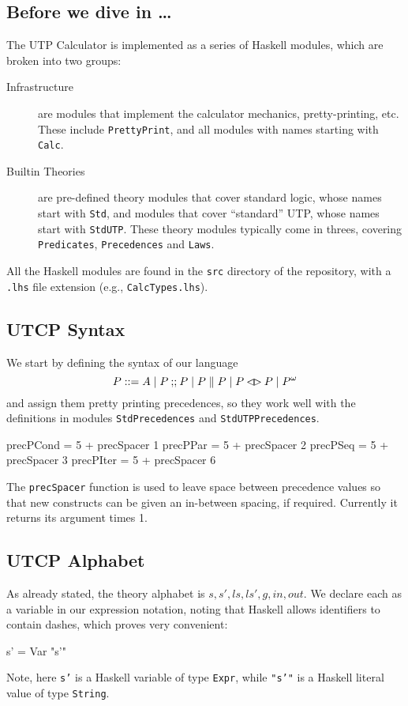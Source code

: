 \subsection{Before we dive in \dots}

The UTP Calculator is implemented as a series
of Haskell modules,
which are broken into two groups:
\begin{description}
  \item[Infrastructure]
    are modules that implement the calculator mechanics,
    pretty-printing, etc.
    These include \texttt{PrettyPrint},
    and all modules with names starting with \texttt{Calc}.
  \item[Builtin Theories]
    are pre-defined theory modules that cover standard logic,
    whose names start with \texttt{Std}, and modules that cover ``standard''
    UTP, whose names start with \texttt{StdUTP}.
    These theory modules typically come in threes, covering
    \texttt{Predicates}, \texttt{Precedences} and \texttt{Laws}.
\end{description}
All the Haskell modules are found in the \texttt{src} directory
of the repository, with a \texttt{.lhs} file extension
(e.g., \texttt{CalcTypes.lhs}).

\subsection{UTCP Syntax}

We start by defining the syntax of our language
\[
   P ::= A \mid P \mathbin{\mathbf{;\!;}} P \mid P \parallel P \mid P \mathbin{\lhd\!\rhd} P \mid {P}^{\omega}
\]
and assign them pretty printing precedences,
so they work well with the definitions in modules
\texttt{StdPrecedences} and \texttt{StdUTPPrecedences}.
\begin{code}
precPCond = 5 + precSpacer  1
precPPar  = 5 + precSpacer  2
precPSeq  = 5 + precSpacer  3
precPIter = 5 + precSpacer  6
\end{code}
The \texttt{precSpacer} function is used to leave space between precedence
values so that new constructs can be given an in-between spacing,
if required. Currently it returns its argument times 1.


\subsection{UTCP Alphabet}

As already stated, the theory alphabet is $s,s',ls,ls',g,in,out$.
We declare each as a variable in our expression notation,
noting that Haskell allows identifiers to contain dashes,
which proves very convenient:
\begin{code}
s' = Var "s'"
\end{code}
Note, here \texttt{s'} is a Haskell variable of type \texttt{Expr},
while \texttt{"s'"} is a Haskell literal value of type \texttt{String}.

